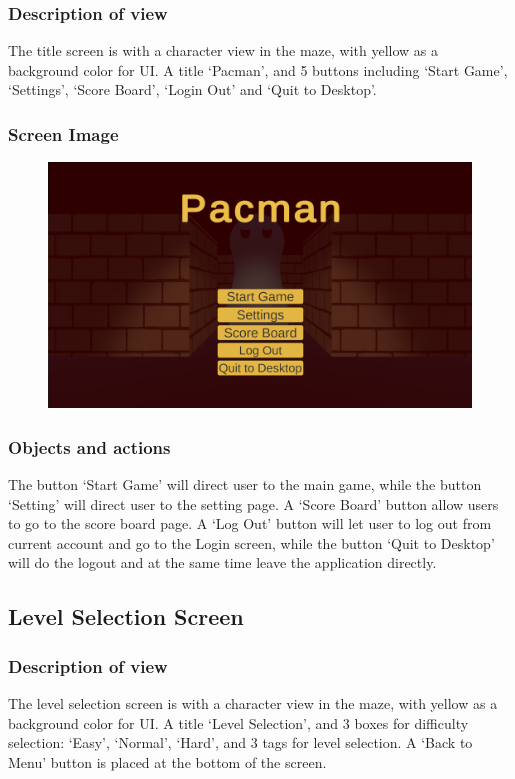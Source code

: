 \documentclass[11pt]{article}
\begin{document}
\subsubsection{Description of view}
The title screen is with a character view in the maze, with yellow as a background color for UI. A title `Pacman', and 5 buttons including `Start Game', `Settings', `Score Board', `Login Out' and `Quit to Desktop'. 
\subsubsection{Screen Image}
\begin{figure}[H]
    \centering
    \includegraphics*[scale=0.2]{UI1.0Main.png}
\end{figure}
\subsubsection{Objects and actions}
The button `Start Game' will direct user to the main game, while the button `Setting' will direct user to the setting page. A `Score Board' button allow users to go to the score board page. A `Log Out' button will let user to log out from current account and go to the Login screen, while the button `Quit to Desktop' will do the logout and at the same time leave the application directly.

\subsection{Level Selection Screen}
\subsubsection{Description of view}
The level selection screen is with a character view in the maze, with yellow as a background color for UI. A title `Level Selection', and 3 boxes for difficulty selection: `Easy', `Normal', `Hard', and 3 tags for level selection. A `Back to Menu' button is placed at the bottom of the screen.
\end{document}
